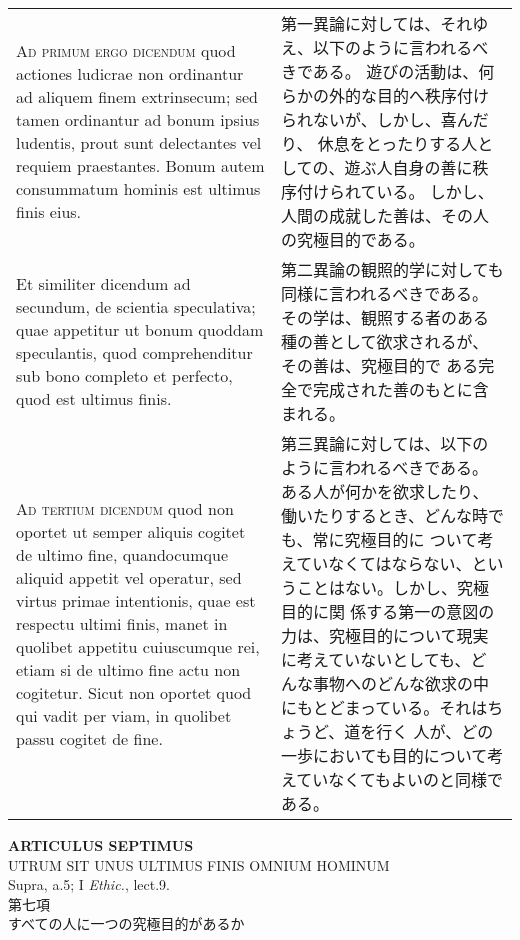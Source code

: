\documentclass[10pt]{jsarticle} %
\begin{document}
\begin{longtable}{p{21em}p{21em}}
{\scshape Ad primum ergo dicendum} quod actiones
ludicrae non ordinantur ad aliquem finem extrinsecum; sed tamen
ordinantur ad bonum ipsius ludentis, prout sunt delectantes vel requiem
praestantes. Bonum autem consummatum hominis est ultimus finis eius.


&


第一異論に対しては、それゆえ、以下のように言われるべきである。
遊びの活動は、何らかの外的な目的へ秩序付けられないが、しかし、喜んだり、
 休息をとったりする人としての、遊ぶ人自身の善に秩序付けられている。
しかし、人間の成就した善は、その人の究極目的である。

\\


Et similiter dicendum ad secundum, de
scientia speculativa; quae appetitur ut bonum quoddam speculantis, quod
comprehenditur sub bono completo et perfecto, quod est ultimus finis.


&

第二異論の観照的学に対しても同様に言われるべきである。
その学は、観照する者のある種の善として欲求されるが、その善は、究極目的で
 ある完全で完成された善のもとに含まれる。


\\


{\scshape Ad tertium dicendum} quod non oportet ut
semper aliquis cogitet de ultimo fine, quandocumque aliquid appetit vel
operatur, sed virtus primae intentionis, quae est respectu ultimi finis,
manet in quolibet appetitu cuiuscumque rei, etiam si de ultimo fine actu
non cogitetur. Sicut non oportet quod qui vadit per viam, in quolibet
passu cogitet de fine.


&


第三異論に対しては、以下のように言われるべきである。
ある人が何かを欲求したり、働いたりするとき、どんな時でも、常に究極目的に
 ついて考えていなくてはならない、ということはない。しかし、究極目的に関
 係する第一の意図の力は、究極目的について現実に考えていないとしても、ど
 んな事物へのどんな欲求の中にもとどまっている。それはちょうど、道を行く
 人が、どの一歩においても目的について考えていなくてもよいのと同様である。


\end{longtable}
\newpage



\begin{center}
 {\Large {\bf ARTICULUS SEPTIMUS}}\\
 {\large UTRUM SIT UNUS ULTIMUS FINIS OMNIUM HOMINUM}\\
 {\footnotesize Supra, a.5; I {\itshape Ethic.}, lect.9.}\\
 {\Large 第七項\\すべての人に一つの究極目的があるか}
\end{center}
\end{document}
